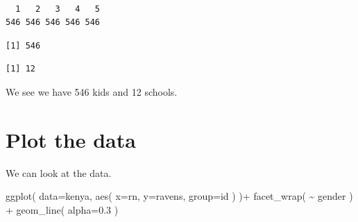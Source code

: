 \documentclass[
  letterpaper,
  DIV=11,
  numbers=noendperiod]{scrreprt}
\newenvironment{Shaded}{}{}
\newcommand{\AttributeTok}[1]{\textcolor[rgb]{0.49,0.56,0.16}{#1}}
\newcommand{\CommentTok}[1]{\textcolor[rgb]{0.38,0.63,0.69}{\textit{#1}}}
\newcommand{\FloatTok}[1]{\textcolor[rgb]{0.25,0.63,0.44}{#1}}
\newcommand{\FunctionTok}[1]{\textcolor[rgb]{0.02,0.16,0.49}{#1}}
\newcommand{\NormalTok}[1]{#1}
\newcommand{\SpecialCharTok}[1]{\textcolor[rgb]{0.25,0.44,0.63}{#1}}
\begin{document}
\begin{Shaded}
\end{Shaded}

\begin{verbatim}

  1   2   3   4   5 
546 546 546 546 546 
\end{verbatim}

\begin{Shaded}
\end{Shaded}

\begin{verbatim}
[1] 546
\end{verbatim}

\begin{Shaded}
\end{Shaded}

\begin{verbatim}
[1] 12
\end{verbatim}

We see we have 546 kids and 12 schools.

\section{Plot the data}\label{plot-the-data-1}

We can look at the data.

\begin{Shaded}
\begin{Highlighting}[]
\FunctionTok{ggplot}\NormalTok{( }\AttributeTok{data=}\NormalTok{kenya, }\FunctionTok{aes}\NormalTok{( }\AttributeTok{x=}\NormalTok{rn, }\AttributeTok{y=}\NormalTok{ravens, }\AttributeTok{group=}\NormalTok{id )  )}\SpecialCharTok{+} 
            \FunctionTok{facet\_wrap}\NormalTok{( }\SpecialCharTok{\textasciitilde{}}\NormalTok{ gender ) }\SpecialCharTok{+} 
            \FunctionTok{geom\_line}\NormalTok{( }\AttributeTok{alpha=}\FloatTok{0.3}\NormalTok{ )}
\end{Highlighting}
\end{Shaded}
\end{document}
